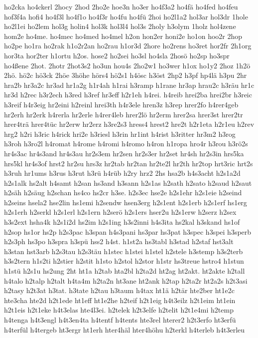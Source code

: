 {ho2cka
ho4ckerl
2hocy
2hod
2ho2e
hoe3n
ho3er
ho4f3a2
ho4fä
ho4fed
ho4feu
hof3f4a
hofi4
ho4f3l
ho4f1o
ho4f3r
ho4fu
ho4fü
2hoi
ho2l1a2
hol3ar
hol3dr
1hole
ho2l1ei
ho2lem
hol3g
holin4
hol3k
hol3l4
hol3s
2holy
h3olym
1holz
hol4zene
hom2e
ho4me.
ho4mec
ho4med
ho4mel
h2on
hon2er
honi2e
ho1on
hoo2r
2hop
ho2pe
ho1ra
ho2rak
h1o2r2an
ho2rau
h1or3d
2hore
ho2rens
ho3ret
hor2fr
2h1org
hor3ta
hor2ter
h1ortu
h2os.
hose2
ho2sei
ho3sl
ho4sla
2hosö
ho2sp
ho3spr
ho4ßene
2hot.
2hotr
2hot3s2
ho3un
hou4s
2ho2w1
ho3wer
h1ox
ho1y2
2hoz
1h2ö
2hö.
hö2c
hö3ck
2höe
3höhe
hörs4
hö2s1
h4ösc
h3öst
2hp2
h3pf
hp4lä
h3pu
2hr
hra2b
hr3a2c
hr3ad
hr1a2g
h1r4ah
h1rai
h3ramp
h1rane
hr3ap
hrau2c
h3räu
hr1c
hr3d
h2rec
h3r2ech
h3red
h3ref
hr3eff
h2r1eh
h4rei.
h4reib
hrei2ba
hrei2br
h3reic
h3reif
h4r3eig
hr2eini
h2reinl
hrei3th
h4r3ele
hren3z
h3rep
hrer2fo
h4rer4geb
hr2erh
hr2erk
h4rerla
hr2erle
h4rer4leb
hrer2lö
hr2erm
hrer2sa
hrer3st
hrer2tr
hrer4trä
hrer4tüc
hr2erw
hr2erz
h3re2s3
hress4
hrest2
hre2t
h2r1eta
h2r1eu
h2rev
hrg2
h2ri
h3ric
h4rick
hri2e
h3riesl
h3rin
hr1int
h4rist
h3ritter
hr3m2
h3rog
h3roh
h3ro2l
h4romat
h4rome
h4romi
h4romo
h4ron
h1ropa
hro4r
h3rou
h3rö2s
hr4s3ac
hr4s3and
hr4s3au
hr2s3em
hr2sen
hr2s3er
hr2set
hr4sh
hr2s3in
hrs5ka
hrs5kl
hr4s3of
hrst2
hr2su
hrs3z
hr2tab
hr2tan
hr2te2l
hr2th
hr2top
hrt3ric
hrt2s
h3ruh
hr1ums
h3rus
h3rut
h3rü
h4rüb
h2ry
hrz2
2hs
hsa2b
h4s3acht
h2s1a2d
h2s1alk
hs2alt
h4samt
h2san
hs3and
h3sann
h2s1as
h2sath
h2sato
h2saud
h2saut
h2säh
h2säug
h2schan
hs4co
hs2cr
h3se.
h2s3ec
hse2e
h2s1ehr
h2s1eie
h2seind
h2seins
hsela2
hse2lin
hs1emi
h2sendw
hsen3erg
h2s1ent
h2s1erb
h2s1erf
hs1erg
h2s1erh
h2serkl
h2s1erl
h2s1ern
h2serö
h2s1ers
hser2u
h2s1erw
h2serz
h2sex
h3s2ext
hsha4k
h2s1i2d
hs2im
h2s1ing
h3s2inni
h4s3ita
hs2kal
h3skand
hs1of
h2sop
hs1or
hs2p
h2s3pac
h3span
h4s3pani
hs3par
hs3pat
h3spec
h3spei
h3sperb
h2s3ph
hs3po
h3spra
h3spü
hss2
h4st.
h1st2a
hs3tabl
h3stad
h2staf
hst3alt
h3stan
hst3arb
h2s3tau
h2s3täu
h1stec
h1stei
h1stel
h2stele
h3stemp
h3s2terb
h3s2tern
h1s2ti
h2stier
h2stit
h1sto
h2stol
h2stor
h1str
hs3treue
hstro4
h1stun
h1stü
h2s1u
hs2ung
2ht
ht1a
h2tab
hta2bl
h2ta2d
ht2ag
ht2akt.
ht2akte
h2tall
h4talo
h2talp
h2talt
h4ta4m
h2ta2n
ht3ane
ht2ank
h2tap
h2ta2r
ht2a2s
h2t3asi
h2tasy
h2t3at
h3tat.
h3tate
h2tau
h3taum
h4tax
ht1ä
h2tär
hte2ber
ht1e2c
hte3cha
hte2d
h2t1ede
ht1eff
ht1e2he
h2teif
h2t1eig
h4t3eilz
h2t1eim
ht1ein
h2t1eis
h2t1eke
h4t3elas
hte4l3ei.
h2telek
h2t3elfe
h2telit
h2t1e4mi
h2temp
h4tenga
h4t3engl
h4t3en4ta
h4tentf
h4tents
hte3rel
hterer2
h2t3erfo
ht3erfü
h4terfül
h4tergeb
ht3ergr
ht1erh
hter4häl
hter4höhu
h2terkl
h4terleb
h4t3erleu
}
